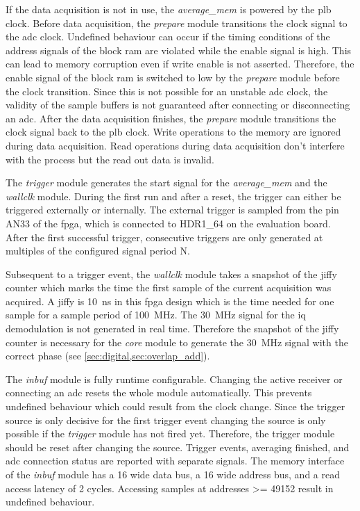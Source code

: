 \documentclass[12pt,a4paper,parskip=full,abstract=true,BCOR=12mm]{scrreprt}
\def\device#1{\mbox{\textit{#1}}}
\begin{document}
If the data acquisition is not in use, the \device{average\_mem} is powered by
the \gls{plb} clock. Before data acquisition, the \device{prepare} module
transitions the clock signal to the \gls{adc} clock. Undefined behaviour can
occur if the timing conditions of the address signals of the block \gls{ram}
are violated while the enable signal is high. This can lead to memory corruption
even if write enable is not asserted\cite{virtex5}. Therefore, the enable signal
of the block \gls{ram} is switched to low by the \device{prepare} module before
the clock transition. Since this is not possible for an unstable \gls{adc} clock,
the validity of the sample buffers is not guaranteed after connecting or
disconnecting an \gls{adc}. After the data acquisition finishes, the
\device{prepare} module transitions the clock signal back to the \gls{plb} clock.
Write operations to the memory are ignored during data acquisition. Read operations
during data acquisition don't interfere with the process but the read out data is invalid.

The \device{trigger} module generates the start signal for the \device{average\_mem}
and the \device{wallclk} module. During the first run and after a reset, the trigger can either be triggered
externally or internally. The external trigger is sampled from the pin AN33 of the
\gls{fpga}, which is connected to HDR1\_64 on the evaluation board. After the first
successful trigger, consecutive triggers are only generated at multiples of the configured signal period \gls{N}.

Subsequent to a trigger event, the \device{wallclk} module takes a snapshot of the
jiffy counter which marks the time the first sample of the current acquisition
was acquired. A jiffy is \SI{10}{\nano\second} in this \gls{fpga} design which is the time needed for
one sample for a sample period of \SI{100}{\mega\hertz}. The \SI{30}{\mega\hertz} signal for the \gls{iq} demodulation
is not generated in real time. Therefore the snapshot of the jiffy counter is necessary
for the \device{core} module to generate the \SI{30}{\mega\hertz} signal with the
correct phase (see \cref{sec:digital,sec:overlap_add}).

The \device{inbuf} module is fully runtime configurable. Changing the active receiver
or connecting an \gls{adc} resets the whole module automatically. This prevents undefined
behaviour which could result from the clock change. Since the trigger source is only
decisive for the first trigger event changing the source is only possible if the \device{trigger}
module has not fired yet. Therefore, the trigger module should be reset after changing
the source. Trigger events, averaging finished, and \gls{adc} connection status are reported
with separate signals. The memory interface of the \device{inbuf} module has a \SI{16}{\bit} wide data bus,
a \SI{16}{\bit} wide address bus, and a read access latency of 2 cycles. Accessing samples
at addresses \num{>= 49152} result in undefined behaviour.
\end{document}
